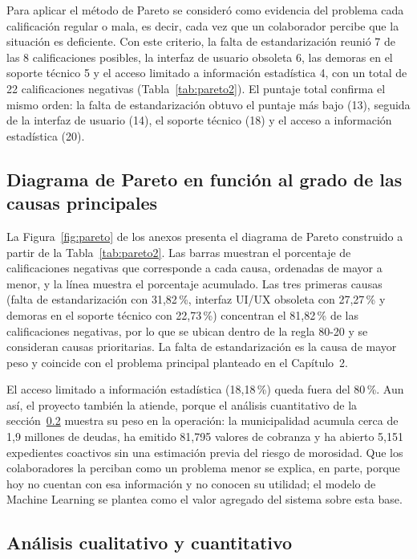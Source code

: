 \documentclass[12pt,a4paper]{report}
\begin{document}
Para aplicar el método de Pareto se consideró como evidencia del problema cada calificación regular o mala, es decir, cada vez que un colaborador percibe que la situación es deficiente. Con este criterio, la falta de estandarización reunió 7 de las 8 calificaciones posibles, la interfaz de usuario obsoleta 6, las demoras en el soporte técnico 5 y el acceso limitado a información estadística 4, con un total de 22 calificaciones negativas (Tabla~\ref{tab:pareto2}). El puntaje total confirma el mismo orden: la falta de estandarización obtuvo el puntaje más bajo (13), seguida de la interfaz de usuario (14), el soporte técnico (18) y el acceso a información estadística (20).

\subsection{Diagrama de Pareto en función al grado de las causas principales}

La Figura~\ref{fig:pareto} de los anexos presenta el diagrama de Pareto construido a partir de la Tabla~\ref{tab:pareto2}. Las barras muestran el porcentaje de calificaciones negativas que corresponde a cada causa, ordenadas de mayor a menor, y la línea muestra el porcentaje acumulado. Las tres primeras causas (falta de estandarización con 31,82\,\%, interfaz UI/UX obsoleta con 27,27\,\% y demoras en el soporte técnico con 22,73\,\%) concentran el 81,82\,\% de las calificaciones negativas, por lo que se ubican dentro de la regla 80-20 y se consideran causas prioritarias. La falta de estandarización es la causa de mayor peso y coincide con el problema principal planteado en el Capítulo~2.

El acceso limitado a información estadística (18,18\,\%) queda fuera del 80\,\%. Aun así, el proyecto también la atiende, porque el análisis cuantitativo de la sección~\ref{sec:analisis-cuali-cuanti} muestra su peso en la operación: la municipalidad acumula cerca de 1,9 millones de deudas, ha emitido 81,795 valores de cobranza y ha abierto 5,151 expedientes coactivos sin una estimación previa del riesgo de morosidad. Que los colaboradores la perciban como un problema menor se explica, en parte, porque hoy no cuentan con esa información y no conocen su utilidad; el modelo de Machine Learning se plantea como el valor agregado del sistema sobre esta base.

\subsection{Análisis cualitativo y cuantitativo}
\label{sec:analisis-cuali-cuanti}
\end{document}

